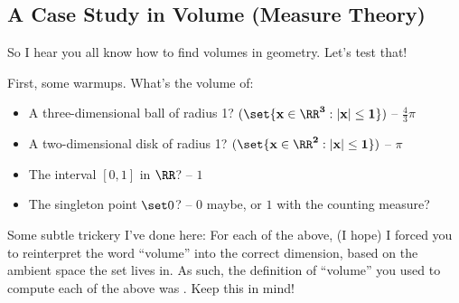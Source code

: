 \documentclass[12pt]{article}
\begin{document}
\subsection{A Case Study in Volume (Measure Theory)}
So I hear you all know how to find volumes in geometry. Let's test
that!

\noindent First, some warmups. What's the volume of:  
\begin{itemize}
  \item A three-dimensional ball of radius 1? $(\set{\bf
    x \in \RR^3 : |\bf x| \leq 1})$ -- $\frac 43 \pi$
  \item A two-dimensional disk of radius 1? $(\set{\bf x \in \RR^2 : |\bf x|
    \leq 1})$ -- $\pi$
  \item The interval $[0,1]$ in $\RR$? -- $1$
  \item The singleton point $\set 0$? -- $0$ maybe, or $1$ with the counting measure? 
\end{itemize}
Some subtle trickery I've done here: For each of the above, (I hope) I 
forced you to reinterpret the word ``volume'' into the correct dimension, based
on the ambient space the set lives in. As
such, the definition of ``volume'' you used to compute each of the above was
. Keep this in mind!  
\end{document}
